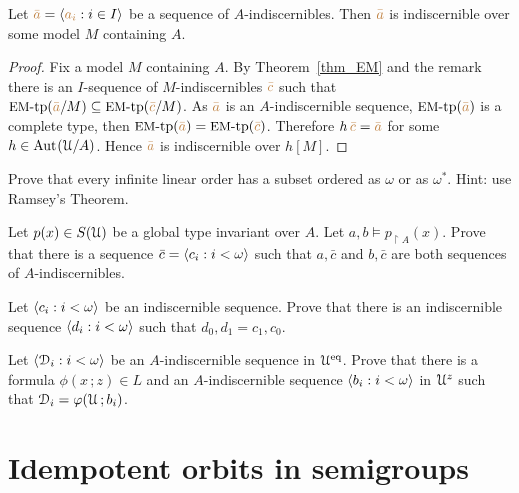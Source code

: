 \begin{proposition}\label{prop_indiscernibles_set_model}
Let ${\color{brown}\bar a}=\langle{\color{brown}a_i}:i\in I\rangle$ be a sequence of $A$-indiscernibles.
Then ${\color{brown}\bar a}$ is indiscernible over some model $M$ containing $A$.
\end{proposition}

\begin{proof}
Fix a model $M$ containing $A$.
By Theorem~\ref{thm_EM} and the remark there is an $I$-sequence of $M$-indiscernibles ${\color{brown}\bar c}$ such that $\mbox{{\small EM}-tp}({\color{brown}\bar a}/M)\subseteq\mbox{{\small EM}-tp}({\color{brown}\bar c}/M)$.
As ${\color{brown}\bar a}$ is an $A$-indiscernible sequence, $\mbox{{\small EM}-tp}({\color{brown}\bar a})$ is a complete type, then  $\mbox{{\small EM}-tp}({\color{brown}\bar a})=\mbox{{\small EM}-tp}({\color{brown}\bar c})$.
Therefore $h\,{\color{brown}\bar c}={\color{brown}\bar a}$ for some $h\in{\rm Aut\kern.15ex}(\EuScript U/A)$.
Hence ${\color{brown}\bar a}$ is indiscernible over $h[M]$.
\end{proof}

\begin{exercise}\label{ex_Ramsey_wfo}
  Prove that every infinite linear order has a subset ordered as $\omega$ or as $\omega^*$. Hint: use Ramsey's Theorem.
\end{exercise}

\begin{exercise}
  Let $p(x)\in S(\EuScript U)$ be a global type invariant over $A$.
  Let $a,b\models p_{\restriction A}(x)$.
  Prove that there is a sequence $\bar c=\langle c_i:i<\omega\rangle$ such that $a,\bar c$ and $b,\bar c$ are both sequences of $A$-indiscernibles.
\end{exercise}

\begin{exercise}\label{ex_symmetry_ind}
  Let $\langle c_i:i<\omega\rangle$ be an indiscernible sequence.
  Prove that there is an indiscernible sequence $\langle d_i:i<\omega\rangle$ such that $d_0,d_1 = c_1,c_0$.
\end{exercise}

\begin{exercise}
  Let $\langle\EuScript D_i:i<\omega\rangle$ be an $A$-indiscernible sequence in $\EuScript U^{{\rm eq}}$.
  Prove that there is a formula $\phi(x\,;z)\in L$ and an $A$-indiscernible sequence $\langle b_i:i<\omega\rangle$ in $\EuScript U^z$ such that $\EuScript D_i=\varphi(\EuScript U\,;b_i)$.
\end{exercise}

\section{Idempotent orbits in semigroups}\label{semigroups}

